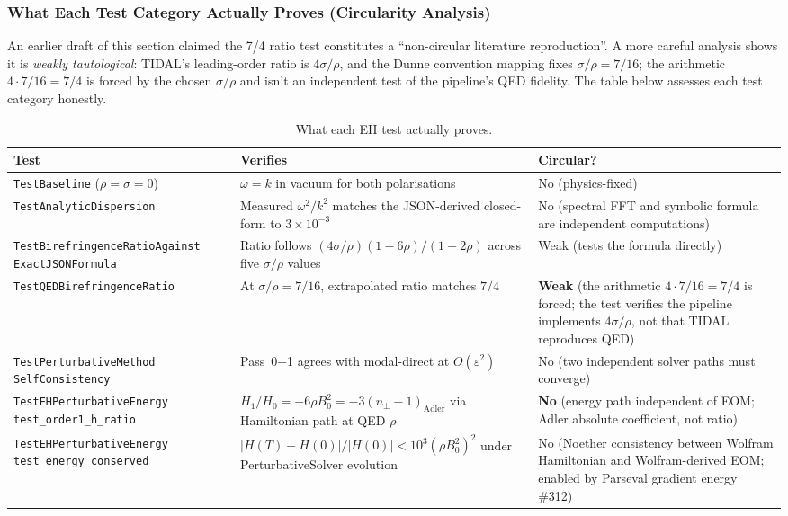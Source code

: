\subsubsection{What Each Test Category Actually Proves (Circularity Analysis)}
\label{sec:pr-eh-circularity}

An earlier draft of this section claimed the 7/4 ratio test constitutes a ``non-circular literature reproduction''. A more careful analysis shows it is \emph{weakly tautological}: TIDAL's leading-order ratio is $4\sigma/\rho$, and the Dunne convention mapping fixes $\sigma/\rho = 7/16$; the arithmetic $4 \cdot 7/16 = 7/4$ is forced by the chosen $\sigma/\rho$ and isn't an independent test of the pipeline's QED fidelity. The table below assesses each test category honestly.

\begin{table}[htbp]
\centering
\caption{What each EH test actually proves.}
\label{tab:eh-test-circularity}
\begin{tabular}{@{}p{}p{}p{}@{}}
\toprule
Test & Verifies & Circular? \\
\midrule
\texttt{TestBaseline} ($\rho=\sigma=0$) & $\omega = k$ in vacuum for both polarisations & No (physics-fixed) \\
\texttt{TestAnalyticDispersion} & Measured $\omega^2/k^2$ matches the JSON-derived closed-form to $3\times 10^{-3}$ & No (spectral FFT and symbolic formula are independent computations) \\
\texttt{TestBirefringenceRatioAgainst ExactJSONFormula} & Ratio follows $(4\sigma/\rho)(1-6\rho)/(1-2\rho)$ across five $\sigma/\rho$ values & Weak (tests the formula directly) \\
\texttt{TestQEDBirefringenceRatio} & At $\sigma/\rho = 7/16$, extrapolated ratio matches $7/4$ & \textbf{Weak} (the arithmetic $4\cdot7/16 = 7/4$ is forced; the test verifies the pipeline implements $4\sigma/\rho$, not that TIDAL reproduces QED) \\
\texttt{TestPerturbativeMethod SelfConsistency} & Pass~0+1 agrees with modal-direct at $O(\varepsilon^2)$ & No (two independent solver paths must converge) \\
\texttt{TestEHPerturbativeEnergy} \newline \texttt{test\_order1\_h\_ratio} & $H_1/H_0 = -6\rho B_0^2 = -3(n_\perp{-}1)_{\mathrm{Adler}}$ via Hamiltonian path at QED $\rho$ & \textbf{No} (energy path independent of EOM; Adler absolute coefficient, not ratio) \\
\texttt{TestEHPerturbativeEnergy} \newline \texttt{test\_energy\_conserved} & $\lvert H(T) - H(0) \rvert / \lvert H(0) \rvert < 10^3(\rho B_0^2)^2$ under PerturbativeSolver evolution & No (Noether consistency between Wolfram Hamiltonian and Wolfram-derived EOM; enabled by Parseval gradient energy \#312) \\
\bottomrule
\end{tabular}
\end{table}

